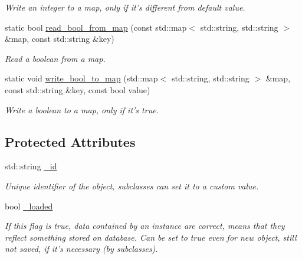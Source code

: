 \begin{DoxyCompactItemize}
\begin{DoxyCompactList}\small\item\em Write an integer to a map, only if it's different from default value. \end{DoxyCompactList}\item 
static bool \hyperlink{classredis3m_1_1patterns_1_1model_a7923fa55c6eca5f1398e08be1c0b776f}{read\-\_\-bool\-\_\-from\-\_\-map} (const std\-::map$<$ std\-::string, std\-::string $>$ \&map, const std\-::string \&key)
\begin{DoxyCompactList}\small\item\em Read a boolean from a map. \end{DoxyCompactList}\item 
static void \hyperlink{classredis3m_1_1patterns_1_1model_a667ee0111f852a5f0594f51252319b6e}{write\-\_\-bool\-\_\-to\-\_\-map} (std\-::map$<$ std\-::string, std\-::string $>$ \&map, const std\-::string \&key, const bool value)
\begin{DoxyCompactList}\small\item\em Write a boolean to a map, only if it's true. \end{DoxyCompactList}\end{DoxyCompactItemize}
\subsection*{Protected Attributes}
\begin{DoxyCompactItemize}
\item 
\hypertarget{classredis3m_1_1patterns_1_1model_a1277b5e895e3b17ff03586455c8ed099}{std\-::string \hyperlink{classredis3m_1_1patterns_1_1model_a1277b5e895e3b17ff03586455c8ed099}{\-\_\-id}}\label{classredis3m_1_1patterns_1_1model_a1277b5e895e3b17ff03586455c8ed099}

\begin{DoxyCompactList}\small\item\em Unique identifier of the object, subclasses can set it to a custom value. \end{DoxyCompactList}\item 
\hypertarget{classredis3m_1_1patterns_1_1model_a724e4b494460ea475844e70b8bd2599b}{bool \hyperlink{classredis3m_1_1patterns_1_1model_a724e4b494460ea475844e70b8bd2599b}{\-\_\-loaded}}\label{classredis3m_1_1patterns_1_1model_a724e4b494460ea475844e70b8bd2599b}

\begin{DoxyCompactList}\small\item\em If this flag is true, data contained by an instance are correct, means that they reflect something stored on database. Can be set to true even for new object, still not saved, if it's necessary (by subclasses). \end{DoxyCompactList}\end{DoxyCompactItemize}



